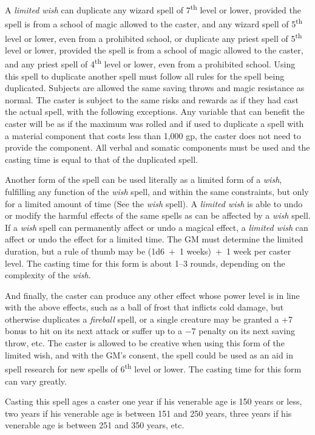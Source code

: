 \begin{multicols}{2}
A \textit{limited wish} can duplicate any wizard spell of 7\textsuperscript{th} level or lower, provided the spell is from a school of magic allowed to the caster, and any wizard spell of 5\textsuperscript{th} level or lower, even from a prohibited school, or duplicate any priest spell of 5\textsuperscript{th} level or lower, provided the spell is from a school of magic allowed to the caster, and any priest spell of 4\textsuperscript{th} level or lower, even from a prohibited school.  Using this spell to duplicate another spell must follow all rules for the spell being duplicated.  Subjects are allowed the same saving throws and magic resistance as normal.  The caster is subject to the same risks and rewards as if they had cast the actual spell, with the following exceptions.  Any variable that can benefit the caster will be as if the maximum was rolled and if used to duplicate a spell with a material component that costs less than 1,000 gp, the caster does not need to provide the component.  All verbal and somatic components must be used and the casting time is equal to that of the duplicated spell.

Another form of the spell can be used literally as a limited form of a \textit{wish}, fulfilling any function of the \textit{wish} spell, and within the same constraints, but only for a limited amount of time (See the \textit{wish} spell).  A \textit{limited wish} is able to undo or modify the harmful effects of the same spells as can be affected by a \textit{wish} spell. If a \textit{wish} spell can permanently affect or undo a magical effect, a \textit{limited wish} can affect or undo the effect for a limited time. The GM must determine the limited duration, but a rule of thumb may be (1d6~+~1 weeks)~+~1 week per caster level.  The casting time for this form is about 1--3 rounds, depending on the complexity of the \textit{wish}.

And finally, the caster can produce any other effect whose power level is in line with the above effects, such as a ball of frost that inflicts cold damage, but otherwise duplicates a \textit{fireball} spell, or a single creature may be granted a +7 bonus to hit on its next attack or suffer up to a $-7$ penalty on its next saving throw, etc.  The caster is allowed to be creative when using this form of the limited wish, and with the GM's consent, the spell could be used as an aid in spell research for new spells of 6\textsuperscript{th} level or lower.  The casting time for this form can vary greatly.

Casting this spell ages a caster one year if his venerable age is 150 years or less, two years if his venerable age is between 151 and 250 years, three years if his venerable age is between 251 and 350 years, etc.


\end{multicols}
